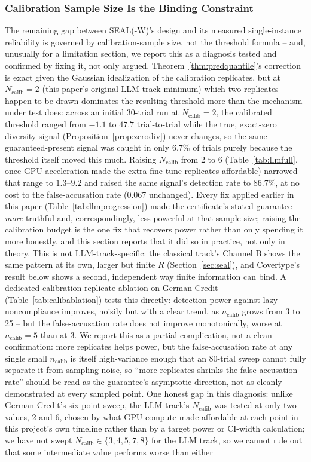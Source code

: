 \documentclass[10pt,journal,compsoc]{IEEEtran}
\begin{document}
\subsubsection{Calibration Sample Size Is the Binding Constraint}

The remaining gap between SEAL(-W)'s design and its measured single-instance reliability is governed by calibration-sample size, not the threshold formula -- and, unusually for a limitation section, we report this as a diagnosis tested and confirmed by fixing it, not only argued. Theorem~\ref{thm:predquantile}'s correction is exact given the Gaussian idealization of the calibration replicates, but at $N_{\text{calib}}=2$ (this paper's original LLM-track minimum) which two replicates happen to be drawn dominates the resulting threshold more than the mechanism under test does: across an initial 30-trial run at $N_{\text{calib}}=2$, the calibrated threshold ranged from $-1.1$ to $47.7$ trial-to-trial while the true, exact-zero diversity signal (Proposition~\ref{prop:zerodiv}) never changes, so the same guaranteed-present signal was caught in only 6.7\% of trials purely because the threshold itself moved this much. Raising $N_{\text{calib}}$ from 2 to 6 (Table~\ref{tab:llmfull}, once GPU acceleration made the extra fine-tune replicates affordable) narrowed that range to $1.3$--$9.2$ and raised the same signal's detection rate to 86.7\%, at no cost to the false-accusation rate (0.067 unchanged). Every fix applied earlier in this paper (Table~\ref{tab:llmprogression}) made the certificate's stated guarantee \emph{more} truthful and, correspondingly, less powerful at that sample size; raising the calibration budget is the one fix that recovers power rather than only spending it more honestly, and this section reports that it did so in practice, not only in theory. This is not LLM-track-specific: the classical track's Channel B shows the same pattern at its own, larger but finite $R$ (Section~\ref{sec:seal}), and Covertype's result below shows a second, independent way finite information can bind. A dedicated calibration-replicate ablation on German Credit (Table~\ref{tab:calibablation}) tests this directly: detection power against lazy noncompliance improves, noisily but with a clear trend, as $n_{\text{calib}}$ grows from 3 to 25 -- but the false-accusation rate does not improve monotonically, worse at $n_{\text{calib}}=5$ than at $3$. We report this as a partial complication, not a clean confirmation: more replicates helps power, but the false-accusation rate at any single small $n_{\text{calib}}$ is itself high-variance enough that an 80-trial sweep cannot fully separate it from sampling noise, so ``more replicates shrinks the false-accusation rate'' should be read as the guarantee's asymptotic direction, not as cleanly demonstrated at every sampled point. One honest gap in this diagnosis: unlike German Credit's six-point sweep, the LLM track's $N_{\text{calib}}$ was tested at only two values, 2 and 6, chosen by what GPU compute made affordable at each point in this project's own timeline rather than by a target power or CI-width calculation; we have not swept $N_{\text{calib}}\in\{3,4,5,7,8\}$ for the LLM track, so we cannot rule out that some intermediate value performs worse than either 
\end{document}
